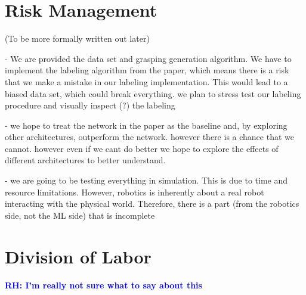 \documentclass[letterpaper, 10 pt]{article}
\newcommand{\rhnote}[1]{\ifthenelse{\boolean{include-notes}}%
 {\textcolor{blue}{\textbf{RH: #1}}}{}}
\begin{document}
\section{Risk Management}

(To be more formally written out later)

- We are provided the data set and grasping generation algorithm. We have to implement the labeling algorithm from the paper, which means there is a risk that we make a mistake in our labeling implementation. This would lead to a biased data set, which could break everything. we plan to stress test our labeling procedure and visually inspect (?) the labeling

- we hope to treat the network in the paper as the baseline and, by exploring other architectures, outperform the network. however there is a chance that we cannot. however even if we cant do better we hope to explore the effects of different architectures to better understand. 

- we are going to be testing everything in simulation. This is due to time and resource limitations. However, robotics is inherently about a real robot interacting with the physical world. Therefore, there is a part (from the robotics side, not the ML side) that is incomplete

\section{Division of Labor}

\rhnote{I'm really not sure what to say about this}


{\footnotesize
    
}
\end{document}
